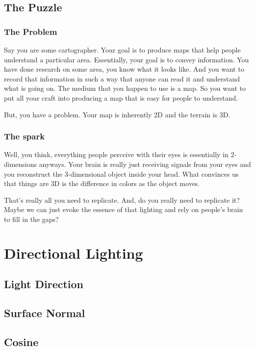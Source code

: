 \documentclass{article}
\begin{document}
\subsection{The Puzzle}

\subsubsection{The Problem}

Say you are some cartographer.
Your goal is to produce maps that help people understand a particular area.
Essentially, your goal is to convey information.
You have done research on some area, you know what it looks like.
And you want to record that information in such a way that anyone can read it and understand what is going on.
The medium that you happen to use is a map.
So you want to put all your craft into producing a map that is easy for people to understand.

But, you have a problem.
Your map is inherently 2D and the terrain is 3D.

\subsubsection{The spark}

Well, you think, everything people perceive with their eyes is essentially in 2-dimensions anyways.
Your brain is really just receiving signals from your eyes and you reconstruct the 3-dimensional object inside your head.
What convinces us that things are 3D is the difference in colors as the object moves.

That's really all you need to replicate.
And, do you really need to replicate it?
Maybe we can just evoke the essence of that lighting and rely on people's brain to fill in the gaps?

\section{Directional Lighting}

\subsection{Light Direction}

\subsection{Surface Normal}

\subsection{Cosine}
\end{document}
